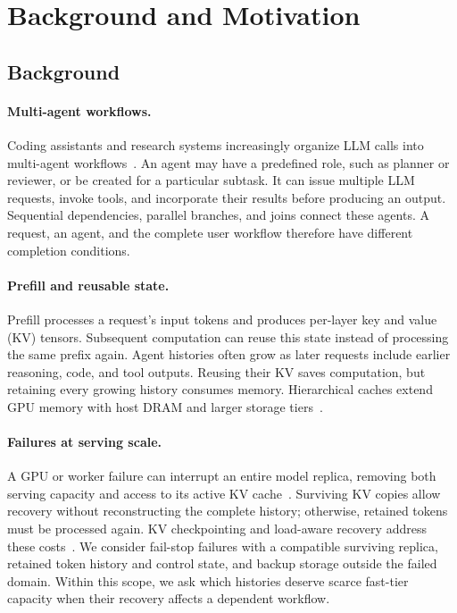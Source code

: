 \section{Background and Motivation}
\label{sec:background-motivation}

\subsection{Background}
\label{sec:motivation-background}

\paragraph{Multi-agent workflows.}
Coding assistants and research systems increasingly organize LLM calls
into multi-agent workflows~\cite{wu2023autogen,anthropic2025multiagent}.
An agent may have a predefined role, such as planner or reviewer, or be
created for a particular subtask. It can issue multiple LLM requests,
invoke tools, and incorporate their results before producing an output.
Sequential dependencies, parallel branches, and joins connect these
agents. A request, an agent, and the complete user workflow therefore
have different completion conditions.

\paragraph{Prefill and reusable state.}
Prefill processes a request's input tokens and produces per-layer key and
value (KV) tensors. Subsequent computation can reuse this state instead
of processing the same prefix again. Agent histories often grow as later
requests include earlier reasoning, code, and tool outputs. Reusing their
KV saves computation, but retaining every growing history consumes memory.
Hierarchical caches extend GPU memory with host DRAM and larger storage
tiers~\cite{qin2025mooncake,gao2024cachedattention}.

\paragraph{Failures at serving scale.}
A GPU or worker failure can interrupt an entire model replica, removing
both serving capacity and access to its active KV cache~\cite{cao2026lumen}.
Surviving KV copies allow recovery without reconstructing the complete
history; otherwise, retained tokens must be processed again.
KV checkpointing and load-aware recovery address these
costs~\cite{strati2024dejavu,jayakody2026ghostserve,cao2026lumen}.
We consider fail-stop failures with a compatible surviving replica,
retained token history and control state, and backup storage outside the
failed domain. Within this scope, we ask which histories deserve scarce
fast-tier capacity when their recovery affects a dependent workflow.

